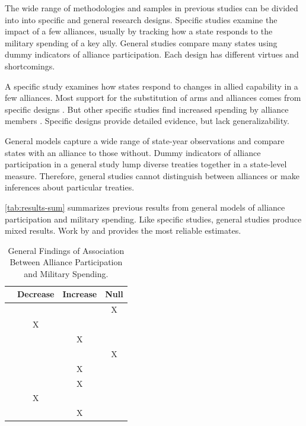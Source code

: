 \documentclass[12pt]{article}
\begin{document}
The wide range of methodologies and samples in previous studies can be divided into into specific and general research designs.  
Specific studies examine the impact of a few alliances, usually by tracking how a state responds to the military spending of a key ally. 
General studies compare many states using dummy indicators of alliance participation. 
Each design has different virtues and shortcomings. 


A specific study examines how states respond to changes in allied capability in a few alliances. 
Most support for the substitution of arms and alliances comes from specific designs \citep{BarnettLevy1991, Morrow1993, Sorokin1994, PluemperNeumayer2015}. 
But other specific studies find increased spending by alliance members \citep{ConybeareSandler1990, Chenetal1996}. 
Specific designs provide detailed evidence, but lack generalizability. 


General models capture a wide range of state-year observations and compare states with an alliance to those without.
Dummy indicators of alliance participation in a general study lump diverse treaties together in a state-level measure. 
Therefore, general studies cannot distinguish between alliances or make inferences about particular treaties. 


\autoref{tab:results-sum} summarizes previous results from general models of alliance participation and military spending. 
Like specific studies, general studies produce mixed results. 
Work by \citet{DigiuseppePoast2016} and \citet{Horowitzetal2017} provides the most reliable estimates. 


\begin{table}[hbt!]
\begin{center}
\begin{tabular}{lccc}
     & Decrease & Increase & Null \\
\hline
\citet{MostSiverson1987} &  &  & X \\
\citet{Conybeare1994} & X & &  \\
\citet{Diehl1994} &  & X &  \\
\citet{Goldsmith2003} &  &  & X \\
\citet{MorganPalmer2006} &  & X & \\ 
\citet{QuirozFlores2011} &  & X &  \\ 
\citet{DigiuseppePoast2016} & X &  & \\ 
\citet{Horowitzetal2017} &  & X & \\ 
\hline
\end{tabular}
\caption{General Findings of Association Between Alliance Participation and Military Spending.}
\label{tab:results-sum}
\end{center} 
\end{table}
\end{document}
